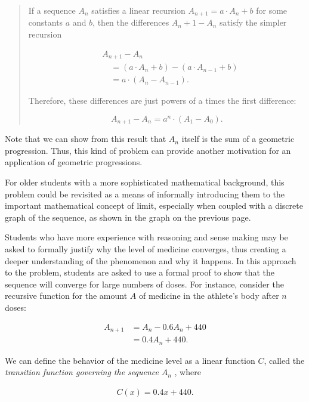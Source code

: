 \documentclass[
  10pt,
  a4paper,
  landscape,
  twoside,
  openany
]{scrbook}
\begin{document}
{\begin{description}
  \begin{quotation}
    If a sequence $A_n$ satisfies a linear recursion $A_{n+1} = a \cdot A_n + b$ for some constants $a$ and $b$, then the differences $A_n +1 - A_n$ satisfy the simpler recursion

    \begin{align*}
      &A_{n+1}-A_n \\
      &\quad =(a\cdot A_n+b)-(a\cdot A_{n-1}+b) \\
      &\quad =a\cdot (A_n-A_{n-1}).
    \end{align*}

    Therefore, these differences are just powers of a times the first difference:

    $$
    A_{n+1}-A_n
      =a^n\cdot (A_1-A_0).
    $$
  \end{quotation}

  Note that we can show from this result that $A_n$ itself is the sum of a geometric progression. Thus, this kind of problem can provide another motivation for an application of geometric progressions.
  \item[Method 4.] For older students with a more sophisticated mathematical background, this problem could be revisited as a means of informally introducing them to the important mathematical concept of limit, especially when coupled with a discrete graph of the sequence, as shown in the graph on the previous page.
  \item[Method 5.] Students who have more experience with reasoning and sense making may be asked to formally justify why the level of medicine converges, thus creating a deeper understanding of the phenomenon and why it happens. In this approach to the problem, students are asked to use a formal proof to show that the sequence will converge for large numbers of doses. For instance, consider the recursive function for the amount $A$ of medicine in the athlete's body after $n$ doses:

  \begin{align*}
    A_{n+1}
      &=A_n-0.6A_n+440 \\
      &=0.4A_n+440. \tag{1}
  \end{align*} 

  We can define the behavior of the medicine level as a linear function $C$, called the \emph{transition function governing the sequence} $A_n$ , where

    \begin{align*}
      C(x)=0.4x+440. \tag{2}
    \end{align*} 


\end{description}}
\end{document}
